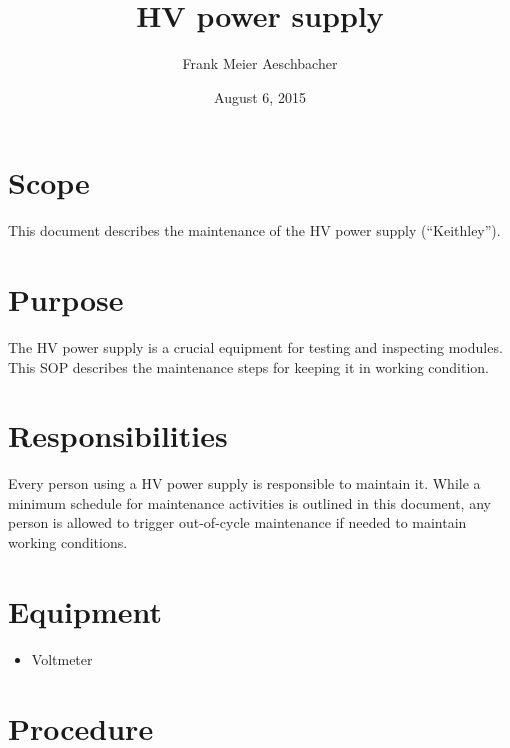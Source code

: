 \documentclass[12pt]{unlsilabsop}
\title{HV power supply}
\date{August 6, 2015}
\author{Frank Meier Aeschbacher}
\begin{document}
\maketitle

\section{Scope}
This document describes the maintenance of the HV power supply (``Keithley'').

\section{Purpose}
The HV power supply is a crucial equipment for testing and inspecting modules. This SOP describes the maintenance steps for keeping it in working condition.


\section{Responsibilities}
Every person using a HV power supply is responsible to maintain it. While a minimum schedule for maintenance activities is outlined in this document, any person is allowed to trigger out-of-cycle maintenance if needed to maintain working conditions.

\section{Equipment}

\begin{itemize}
    \item Voltmeter
\end{itemize}


\section{Procedure}
\end{document}
